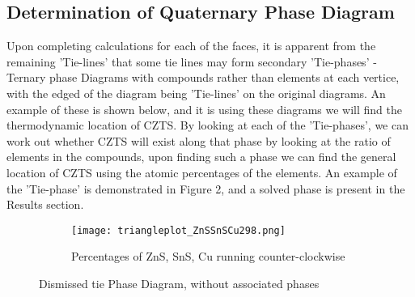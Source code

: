 
\subsection{Determination of Quaternary Phase Diagram}

Upon completing calculations for each of the faces, it is apparent from the remaining 'Tie-lines' that some tie lines may form secondary 'Tie-phases' - Ternary phase Diagrams with compounds rather than elements at each vertice, with the edged of the diagram being 'Tie-lines' on the original diagrams. An example of these is shown below, and it is using these diagrams we will find the thermodynamic location of CZTS. By looking at each of the 'Tie-phases', we can  work out whether CZTS will exist along that phase by looking at the ratio of elements in the compounds, upon finding such a phase we can find the general location of CZTS using the atomic percentages of the elements. An example of the 'Tie-phase' is demonstrated in Figure 2, and a solved phase is present in the Results section.

\begin{figure}
\centering
\begin{subfigure}{80mm}
 \centering
    \texttt{[image: triangleplot\_ZnSSnSCu298.png]}
    \caption{Percentages of ZnS, SnS, Cu running counter-clockwise}
    \label{fig:ZnSSnSCu}
\end{subfigure}%
\caption{Dismissed tie Phase Diagram, without associated phases}
\label{fig:ZnSSnSCuFig}
\end{figure}

